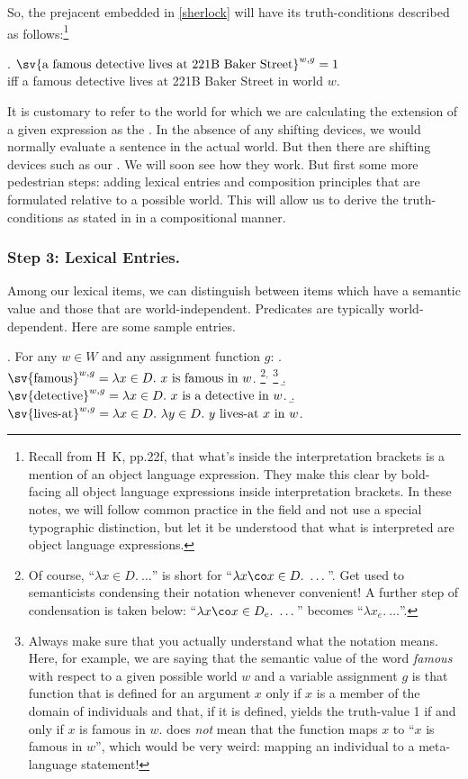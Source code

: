 So, the prejacent embedded in \ref{sherlock} will have its truth-conditions
described as follows:\footnote{Recall from H\amp\ K, pp.22f, that what's inside
  the interpretation brackets is a mention of an object language expression.
  They make this clear by bold-facing all object language expressions inside
  interpretation brackets. In these notes, we will follow common practice in the
  field and not use a special typographic distinction, but let it be understood
  that what is interpreted are object language expressions.}

\ex. $\sv{\mbox{a famous detective lives at 221B Baker Street}}^{w,g} = 1$\\
iff a famous detective lives at 221B Baker Street in world $w$.

It is customary to refer to the world for which we are calculating the extension
of a given expression as the . In the absence of any
shifting devices, we would normally evaluate a sentence in the actual world. But
then there are shifting devices such as our . We will soon see how they work. But first some more pedestrian steps:
adding lexical entries and composition principles that are formulated relative
to a possible world. This will allow us to derive the truth-conditions as stated
in \Last in a compositional manner.

\subsubsection{Step 3: Lexical Entries.} \label{sec:lexical-entries}

Among our lexical items, we can distinguish between items which have a
 semantic value and those that are world-independent.
Predicates are typically world-dependent. Here are some sample entries.

\ex. For any $w \in W$ and any assignment function $g$: \a.
$\sv{\mbox{famous}}^{w,g} = \lambda x \in D.\ x \mbox{ is famous in }
w$.%
\footnote{Of course, ``$\lambda x \in D.\ \dots$'' is short for
  ``$\lambda x\co x \in D.\ \dots$''. Get used to semanticists
  condensing their notation whenever convenient! A further step of
  condensation is taken below: ``$\lambda x\co x \in D_e.\ \dots$''
  becomes ``$\lambda x_e.\ \dots$''.}$^{,}$%
\footnote{Always make sure that you actually understand what the
  notation means. Here, for example, we are saying that the semantic
  value of the word \emph{famous} with respect to a given possible
  world $w$ and a variable assignment $g$ is that function that is
  defined for an argument $x$ only if $x$ is a member of the domain of
  individuals and that, if it is defined, yields the truth-value 1 if
  and only if $x$ is famous in $w$. \Last[a] does \emph{not} mean that the
  function maps $x$ to ``$x$ is famous in $w$'', which would be very weird:
  mapping an individual to a meta-language statement!} \b.
$\sv{\mbox{detective}}^{w,g} = \lambda x \in D.\ x \mbox{ is a
  detective in } w$.
\b.
$\sv{\mbox{lives-at}}^{w,g} = \lambda x \in D.\ \lambda y \in D.\ y
\mbox{ lives-at } x \mbox{ in } w $.

